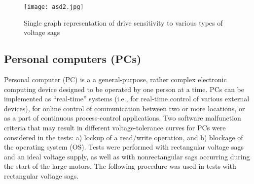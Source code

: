 \documentclass[14pt, a4paper]{extreport}
\begin{document}
 \begin{figure}
     \centering
     \texttt{[image: asd2.jpg]}
     \caption{Single graph representation of drive sensitivity to various types of voltage sags}
     \label{fig:asd_characteristics}
 \end{figure}

\subsection{Personal computers (PCs)} Personal computer (PC) is a a general-purpose, rather complex electronic computing device designed to be operated by one person at a time. PCs can be implemented as “real-time” systems (i.e., for real-time control of various external devices), for online control of communication between two or more locations, or as a part of continuous process-control applications. Two software malfunction criteria that may result in different voltage-tolerance curves for PCs were considered in the tests: a) lockup of a read/write operation, and b) blockage of the operating system (OS). Tests were performed with rectangular voltage sags and an ideal voltage supply, as well as with nonrectangular sags occurring during the start of the large motors. The following procedure was used in tests with rectangular voltage sags.
\end{document}
